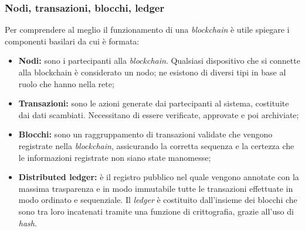 \subsubsection{Nodi, transazioni, blocchi, ledger}
Per comprendere al meglio il funzionamento di una \textit{blockchain} è utile spiegare i componenti basilari da cui è formata:
\begin{itemize}
	\item{\textbf{Nodi: }sono i partecipanti alla \textit{blockchain}. Qualsiasi dispositivo che si connette alla blockchain è considerato un nodo; ne esistono di diversi tipi in base al ruolo che hanno nella rete;} 
	\item{\textbf{Transazioni: }sono le azioni generate dai partecipanti al sistema, costituite dai dati scambiati. Necessitano di essere verificate, approvate e poi archiviate;}
	\item{\textbf{Blocchi: }sono un raggruppamento di transazioni validate che vengono registrate nella \textit{blockchain}, assicurando la corretta sequenza e la certezza che le informazioni registrate non siano state manomesse;}
	\item{\textbf{Distributed ledger: } è il registro pubblico nel quale vengono annotate con la massima trasparenza e in modo immutabile tutte le transazioni effettuate in modo ordinato e sequenziale. Il \textit{ledger} è costituito dall’insieme dei blocchi che sono tra loro incatenati tramite una funzione di crittografia, grazie all’uso di \emph{\gls{hash}}\glsfirstoccur.}
\end{itemize}

